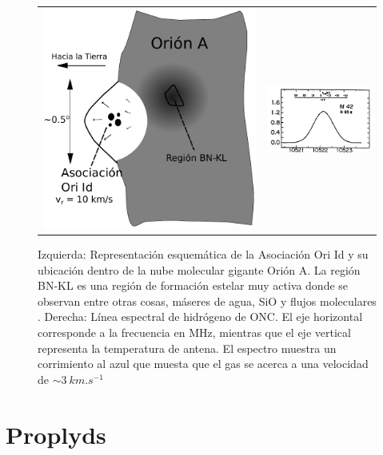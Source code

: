 \begin{figure}
  \centering
  \begin{tabular}{lr}
    \includegraphics[width=0.4\linewidth]{./Figures/champagne} &
    \includegraphics[width=0.5\linewidth]{./Figures/H85-alpha}
    \end{tabular}
  \caption{Izquierda: Representación esquemática de la Asociación Ori Id y su ubicación dentro de la nube molecular gigante Orión A. La región BN-KL es una región de formación estelar muy activa donde se observan entre otras cosas, máseres de agua, SiO y flujos moleculares \citep{Stahler:2004}. Derecha: Línea espectral  de hidrógeno de ONC. El eje horizontal corresponde a la frecuencia en MHz, mientras que el eje vertical representa la temperatura de antena. El espectro muestra un corrimiento al azul que muesta que el gas se acerca a una velocidad de $\sim \SI{3}{km.s^{-1}}$ \citep{Stahler:2004, Churchwell:1970}}
  \label{fig:champagne}
\end{figure}

\section{Proplyds}
